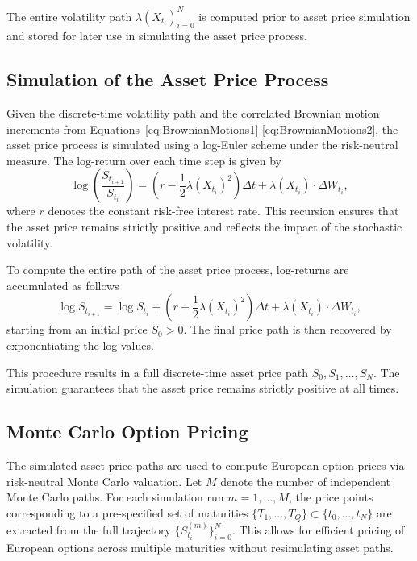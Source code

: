 The entire volatility path ${\lambda(X_{t_i})}_{i=0}^N$ is computed prior to asset price simulation and stored for later use in simulating the asset price process.


\subsection{Simulation of the Asset Price Process} \label{subsec:SimAssetPriceProcess}

Given the discrete-time volatility path and the correlated Brownian motion increments from Equations~\eqref{eq:BrownianMotions1}-\eqref{eq:BrownianMotions2}, the asset price process is simulated using a log-Euler scheme under the risk-neutral measure. The log-return over each time step is given by
\begin{equation} \label{eq:TimeDiscrLogReturn}
    \log\left( \frac{S_{t_{i+1}}}{S_{t_i}} \right) = \left( r - \frac{1}{2} \lambda(X_{t_i})^2 \right) \Delta t + \lambda(X_{t_i}) \cdot \Delta W_{t_i},
\end{equation}
where $r$ denotes the constant risk-free interest rate. This recursion ensures that the asset price remains strictly positive and reflects the impact of the stochastic volatility.

To compute the entire path of the asset price process, log-returns are accumulated as follows
\begin{equation} \label{eq:TimeDiscrLogPrice}
    \log S_{t_{i+1}} = \log S_{t_i} + \left( r - \frac{1}{2} \lambda(X_{t_i})^2 \right) \Delta t + \lambda(X_{t_i}) \cdot \Delta W_{t_i},
\end{equation}
starting from an initial price $S_0 > 0$. The final price path is then recovered by exponentiating the log-values.

This procedure results in a full discrete-time asset price path $S_0, S_1, \ldots, S_N$. The simulation guarantees that the asset price remains strictly positive at all times.


\subsection{Monte Carlo Option Pricing} \label{subsec:MonteCarloOptionPricing}

The simulated asset price paths are used to compute European option prices via risk-neutral Monte Carlo valuation. Let $M$ denote the number of independent Monte Carlo paths. For each simulation run $m = 1, \ldots, M$, the price points corresponding to a pre-specified set of maturities $\{T_1,\ldots,T_Q\} \subset \{t_0,\ldots,t_N\}$ are extracted from the full trajectory $\{S_{t_i}^{(m)}\}_{i=0}^N$. This allows for efficient pricing of European options across multiple maturities without resimulating asset paths.

